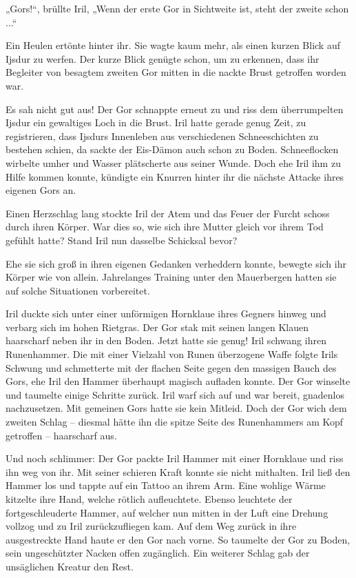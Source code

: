 „Gors!“, brüllte Iril, „Wenn der erste Gor in Sichtweite ist, steht der zweite schon ...“

Ein Heulen ertönte hinter ihr. Sie wagte kaum mehr, als einen kurzen Blick auf Ijsdur zu werfen. Der kurze Blick genügte schon, um zu erkennen, dass ihr Begleiter von besagtem zweiten Gor mitten in die nackte Brust getroffen worden war.

Es sah nicht gut aus! Der Gor schnappte erneut zu und riss dem überrumpelten Ijsdur ein gewaltiges Loch in die Brust. Iril hatte gerade genug Zeit, zu registrieren, dass Ijsdurs Innenleben aus verschiedenen Schneeschichten zu bestehen schien, da sackte der Eis-Dämon auch schon zu Boden. Schneeflocken wirbelte umher und Wasser plätscherte aus seiner Wunde. Doch ehe Iril ihm zu Hilfe kommen konnte, kündigte ein Knurren hinter ihr die nächste Attacke ihres eigenen Gors an.

Einen Herzschlag lang stockte Iril der Atem und das Feuer der Furcht schoss durch ihren Körper. War dies so, wie sich ihre Mutter gleich vor ihrem Tod gefühlt hatte? Stand Iril nun dasselbe Schicksal bevor?

Ehe sie sich groß in ihren eigenen Gedanken verheddern konnte, bewegte sich ihr Körper wie von allein. Jahrelanges Training unter den Mauerbergen hatten sie auf solche Situationen vorbereitet.

Iril duckte sich unter einer unförmigen Hornklaue ihres Gegners hinweg und verbarg sich im hohen Rietgras. Der Gor stak mit seinen langen Klauen haarscharf neben ihr in den Boden. Jetzt hatte sie genug! Iril schwang ihren Runenhammer. Die mit einer Vielzahl von Runen überzogene Waffe folgte Irils Schwung und schmetterte mit der flachen Seite gegen den massigen Bauch des Gors, ehe Iril den Hammer überhaupt magisch aufladen konnte. Der Gor winselte und taumelte einige Schritte zurück. Iril warf sich auf und war bereit, gnadenlos nachzusetzen. Mit gemeinen Gors hatte sie kein Mitleid. Doch der Gor wich dem zweiten Schlag – diesmal hätte ihn die spitze Seite des Runenhammers am Kopf getroffen – haarscharf aus.

Und noch schlimmer: Der Gor packte Iril Hammer mit einer Hornklaue und riss ihn weg von ihr. Mit seiner schieren Kraft konnte sie nicht mithalten. Iril ließ den Hammer los und tappte auf ein Tattoo an ihrem Arm. Eine wohlige Wärme kitzelte ihre Hand, welche rötlich aufleuchtete. Ebenso leuchtete der fortgeschleuderte Hammer, auf welcher nun mitten in der Luft eine Drehung vollzog und zu Iril zurückzufliegen kam. Auf dem Weg zurück in ihre ausgestreckte Hand haute er den Gor nach vorne. So taumelte der Gor zu Boden, sein ungeschützter Nacken offen zugänglich. Ein weiterer Schlag gab der unsäglichen Kreatur den Rest.

